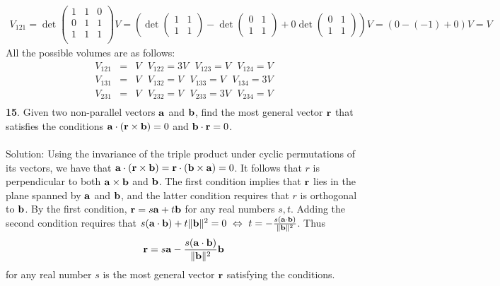 \documentclass[12pt]{amsbook}
\begin{document}
\begin{eqnarray*}
V_{121}=\det\begin{pmatrix} 1 & 1 & 0 \\ 0 & 1 & 1 \\ 1 & 1 & 1 \\ \end{pmatrix}V =(\det\begin{pmatrix}
1&1 \\ 1&1 \end{pmatrix}-\det\begin{pmatrix}
0&1 \\ 1&1 \end{pmatrix}+0\det\begin{pmatrix}
0&1 \\ 1&1 \end{pmatrix} ) V=(0-(-1)+0)V=V
\end{eqnarray*}
All the possible volumes are as follows:
\begin{eqnarray*}
V_{121}&=&V \ \ \ V_{122}= 3V \ \ \ V_{123}= V \ \ \ V_{124}= V \\
V_{131}&=&V \ \ \ V_{132}= V \ \ \ V_{133}= V \ \ \ V_{134}= 3V \\
V_{231}&=&V \ \ \ V_{232}= V \ \ \ V_{233}= 3V \ \ \ V_{234}= V \\
\end{eqnarray*}
{\small\bf 15}. Given two non-parallel vectors ${\bf a}$ and
${\bf b}$, find the most general vector ${\bf r}$ that satisfies 
the conditions
${\bf a}\cdot({\bf r}\times{\bf b})=0$ and ${\bf b}
\cdot{\bf r}=0$.\\
\\
{\sc Solution}: Using the invariance of the triple product under cyclic permutations of its vectors, we have that ${\bf a}\cdot({\bf r}\times{\bf b})={\bf r}\cdot({\bf b}\times{\bf a})=0$. It follows that 
$r$ is perpendicular to both ${\bf a}\times{\bf b}$ and ${\bf b}$. The first condition implies that $\bf r$ lies in the plane spanned by $\bf a$ and $\bf b$, and the latter condition requires that $r$ is orthogonal to $\bf b$. By the first condition, ${\bf r}=s{\bf a}+t{\bf b}$ for any real numbers $s,t$. Adding the second condition requires that $s({\bf a}\cdot{\bf b})+t\|{\bf b}\|^2 =0 \ \Leftrightarrow \ t= -\frac{s({\bf a}\cdot{\bf b})}{\|{\bf b}\|^2}$. Thus $${\bf r}=s{\bf a} -\frac{s({\bf a}\cdot{\bf b})}{\|{\bf b}\|^2} {\bf b}$$
for any real number $s$ is the most general vector $\bf r$ satisfying the conditions.
\\
\\
\end{document}
